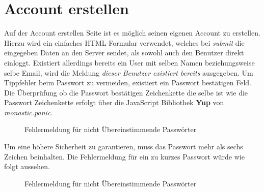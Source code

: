 \section{Account erstellen}

Auf der Account erstellen Seite ist es möglich seinen eigenen Account zu erstellen. Hierzu wird ein 
einfaches HTML-Formular verwendet, welches bei \textit{submit} die eingegeben Daten an den Server sendet,
als sowohl auch den Benutzer direkt einloggt. Existiert allerdings bereits ein User mit selben Namen 
beziehungsweise selbe Email, wird die Meldung \textit{dieser Benutzer existiert bereits} ausgegeben. Um 
Tippfehler beim Passwort zu vermeiden, existiert ein Passwort bestätigen Feld. Die Überprüfung ob die
Passwort bestätigen Zeichenkette die selbe ist wie die Passwort Zeichenkette erfolgt über die 
JavaScript Bibliothek \textbf{Yup} von \textit{monastic.panic}.

\begin{figure}[H]
    \begin{center}
      \caption{Fehlermeldung für nicht Übereinstimmende Passwörter}
    \end{center}
\end{figure}
\pagebreak

Um eine höhere Sicherheit zu garantieren, muss das Passwort mehr als sechs Zeichen beinhalten. Die 
Fehlermeldung für ein zu kurzes Passwort würde wie folgt aussehen.

\begin{figure}[H]
    \begin{center}
      \caption{Fehlermeldung für nicht Übereinstimmende Passwörter}
    \end{center}
\end{figure}


\label{createAccount}